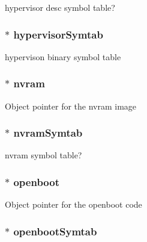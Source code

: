 hypervisor desc symbol table? \hypertarget{classSparcSystem_a826eb5d888ca43343c090f926e7c670f}{
\subsubsection[{hypervisorSymtab}]{$\ast$ {\bf hypervisorSymtab}}}
\label{classSparcSystem_a826eb5d888ca43343c090f926e7c670f}
hypervison binary symbol table \hypertarget{classSparcSystem_a2e5918976373473601e9423650ed3df9}{
\subsubsection[{nvram}]{$\ast$ {\bf nvram}}}
\label{classSparcSystem_a2e5918976373473601e9423650ed3df9}
Object pointer for the nvram image \hypertarget{classSparcSystem_aacbcabf13bf86bdedc9bf1a46ebf08e1}{
\subsubsection[{nvramSymtab}]{$\ast$ {\bf nvramSymtab}}}
\label{classSparcSystem_aacbcabf13bf86bdedc9bf1a46ebf08e1}
nvram symbol table? \hypertarget{classSparcSystem_a8c9bace2c61d3c341b5b2ec031d09b9c}{
\subsubsection[{openboot}]{$\ast$ {\bf openboot}}}
\label{classSparcSystem_a8c9bace2c61d3c341b5b2ec031d09b9c}
Object pointer for the openboot code \hypertarget{classSparcSystem_ac6366336078abefc0f3d2b6bd5846f6b}{
\subsubsection[{openbootSymtab}]{$\ast$ {\bf openbootSymtab}}}
